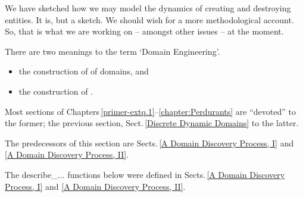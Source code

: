 \begynd
\pind We have sketched how we may model \nyl
      the dynamics of creating and destroying entities.
\begynd
\pind It is, but a sketch.
\pind We should wish for a more methodological account.
\pind So, that is what we are working on -- amongst other issues -- at the moment.
\afslut
\afslut

\label{Domain Engineering: Description and Construction}

\begynd
\pind There are two meanings to the term `Domain Engineering'.
\begin{itemize}
\item the construction of  of domains, and
\item  the construction of .
\end{itemize}
\noindent
\begynd
\pind Most sections of Chapters\,\ref{primer-extq.1}--\ref{chapter:Perdurants} \nyl are
      ``devoted'' to the former;
\pind the previous section, Sect.\,\ref{Discrete Dynamic Domains} to the latter.
\afslut
\afslut


\label{A Domain Discovery
  Process, IIIa}\label{The Perdurant Analysis and Description
  Procedure} 

{The predecessors of this section are Sects.\,\vref{A Domain
    Discovery Process, I} and \vref{A Domain Discovery Process, II}.}{} 

%
      \label{Review of The Endurant Analysis and Description Process}\LLLL

\begynd
\pind The \textsf{describe\_...} functions below were defined in Sects.\,\vref{A Domain
    Discovery Process, I} and \vref{A Domain Discovery Process, II}.
\afslut

